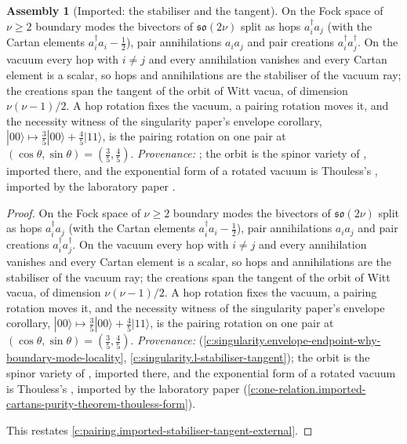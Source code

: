 \documentclass[11pt]{article}
\theoremstyle{definition}
\newtheorem{assembled}[theorem]{Assembly}
\theoremstyle{plain}
\providecommand{\so}{}\renewcommand{\so}{\mathfrak{so}}
\providecommand{\ket}{}\renewcommand{\ket}[1]{|#1\rangle}
\begin{document}
\begin{assembled}[Imported: the stabiliser and the tangent]\label{c:pairing.imported-stabiliser-tangent}
On the Fock space of $\nu \geq 2$ boundary modes the bivectors of $\so(2\nu)$ split as hops $a_i^{\dagger}a_j$ (with the Cartan elements $a_i^{\dagger}a_i - \tfrac12$), pair annihilations $a_ia_j$ and pair creations $a_i^{\dagger}a_j^{\dagger}$. On the vacuum every hop with $i \neq j$ and every annihilation vanishes and every Cartan element is a scalar, so hops and annihilations are the stabiliser of the vacuum ray; the creations span the tangent of the orbit of Witt vacua, of dimension $\nu(\nu-1)/2$. A hop rotation fixes the vacuum, a pairing rotation moves it, and the necessity witness of the singularity paper's envelope corollary, $\ket{00} \mapsto \tfrac35\ket{00} + \tfrac45\ket{11}$, is the pairing rotation on one pair at $(\cos\theta, \sin\theta) = (\tfrac35, \tfrac45)$. \emph{Provenance:} \cite[Prop.~13.4, Cor.~11.6]{ButlerT5}; the orbit is the spinor variety of \cite{Cartan1938, Chevalley1954}, imported there, and the exponential form of a rotated vacuum is Thouless's \cite{Thouless1960}, imported by the laboratory paper \cite[Fact~2.10]{ButlerT16}.
\end{assembled}
\begin{proof}
On the Fock space of $\nu \geq 2$ boundary modes the bivectors of $\so(2\nu)$ split as hops $a_i^{\dagger}a_j$ (with the Cartan elements $a_i^{\dagger}a_i - \tfrac12$), pair annihilations $a_ia_j$ and pair creations $a_i^{\dagger}a_j^{\dagger}$. On the vacuum every hop with $i \neq j$ and every annihilation vanishes and every Cartan element is a scalar, so hops and annihilations are the stabiliser of the vacuum ray; the creations span the tangent of the orbit of Witt vacua, of dimension $\nu(\nu-1)/2$. A hop rotation fixes the vacuum, a pairing rotation moves it, and the necessity witness of the singularity paper's envelope corollary, $\ket{00} \mapsto \tfrac35\ket{00} + \tfrac45\ket{11}$, is the pairing rotation on one pair at $(\cos\theta, \sin\theta) = (\tfrac35, \tfrac45)$. \emph{Provenance:} \cite[Prop.~13.4, Cor.~11.6]{ButlerT5} (\ref{c:singularity.envelope-endpoint-why-boundary-mode-locality}, \ref{c:singularity.l-stabiliser-tangent}); the orbit is the spinor variety of \cite{Cartan1938, Chevalley1954}, imported there, and the exponential form of a rotated vacuum is Thouless's \cite{Thouless1960}, imported by the laboratory paper \cite[Fact~2.10]{ButlerT16} (\ref{c:one-relation.imported-cartans-purity-theorem-thouless-form}).

This restates \ref{c:pairing.imported-stabiliser-tangent-external}.

\end{proof}
\end{document}
